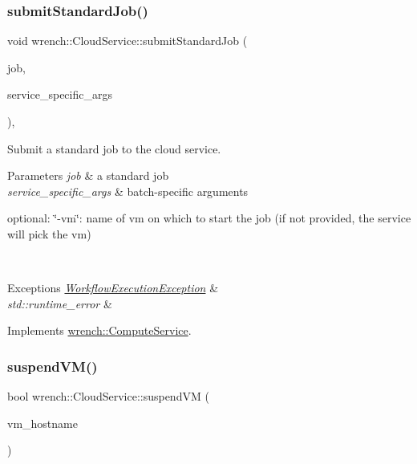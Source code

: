 \subsubsection{\texorpdfstring{submit\+Standard\+Job()}{submitStandardJob()}}
{\footnotesize\ttfamily void wrench\+::\+Cloud\+Service\+::submit\+Standard\+Job (\begin{DoxyParamCaption}\item[{\hyperlink{classwrench_1_1_standard_job}{Standard\+Job} $\ast$}]{job,  }\item[{std\+::map$<$ std\+::string, std\+::string $>$ \&}]{service\+\_\+specific\+\_\+args }\end{DoxyParamCaption})\hspace{0.3cm}{\ttfamily [override]}, {\ttfamily [virtual]}}



Submit a standard job to the cloud service. 


\begin{DoxyParams}{Parameters}
{\em job} & a standard job \\
\hline
{\em service\+\_\+specific\+\_\+args} & batch-\/specific arguments
\begin{DoxyItemize}
\item optional\+: \char`\"{}-\/vm\char`\"{}\+: name of vm on which to start the job (if not provided, the service will pick the vm)
\end{DoxyItemize}\\
\hline
\end{DoxyParams}

\begin{DoxyExceptions}{Exceptions}
{\em \hyperlink{classwrench_1_1_workflow_execution_exception}{Workflow\+Execution\+Exception}} & \\
\hline
{\em std\+::runtime\+\_\+error} & \\
\hline
\end{DoxyExceptions}


Implements \hyperlink{classwrench_1_1_compute_service}{wrench\+::\+Compute\+Service}.

\mbox{\label{classwrench_1_1_cloud_service_a8607984fbc7a852319045e2248b7a6d9}} 
\subsubsection{\texorpdfstring{suspend\+V\+M()}{suspendVM()}}
{\footnotesize\ttfamily bool wrench\+::\+Cloud\+Service\+::suspend\+VM (\begin{DoxyParamCaption}\item[{const std\+::string \&}]{vm\+\_\+hostname }\end{DoxyParamCaption})\hspace{0.3cm}{\ttfamily [virtual]}}



